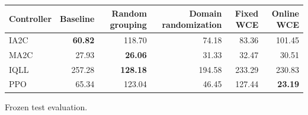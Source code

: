 \begin{tabular}{lrrrrr}
\hline
Controller & Baseline & Random grouping & Domain randomization & Fixed WCE & Online WCE \\
\hline
IA2C & \textbf{60.82} & 118.70 & 74.18 & 83.36 & 101.45 \\
MA2C & 27.93 & \textbf{26.06} & 31.33 & 32.47 & 30.51 \\
IQLL & 257.28 & \textbf{128.18} & 194.58 & 233.29 & 230.83 \\
PPO & 65.34 & 123.04 & 46.45 & 127.44 & \textbf{23.19} \\
\hline
\end{tabular}
Frozen test evaluation.
